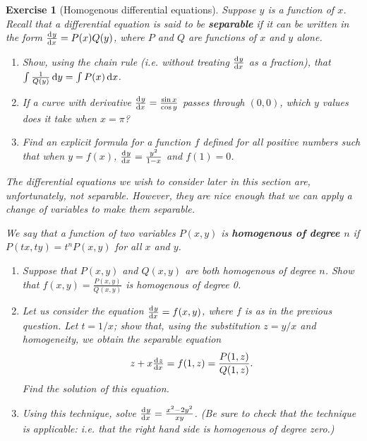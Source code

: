 \documentclass[a4paper,leqno,10pt]{article}
\theoremstyle{exercise}
\newtheorem{Exercise}{Exercise}
\newenvironment{exercise}
  {\begin{mdframed}\begin{Exercise}}
  {\end{Exercise}\end{mdframed}}
\theoremstyle{plain}
\theoremstyle{definition}
\theoremstyle{remark}
\newcommand{\df}{\textbf}
\begin{document}
\begin{exercise}[Homogenous differential equations]
  Suppose $ y $ is a function of $ x $. Recall that a differential equation is said to be \df{separable} if it can
  be written in the form $ \od{y}{x} = P(x) Q(y) $, where $ P $ and $ Q $ are functions of $ x $ and $ y $ alone.
  \begin{enumerate}
    \item Show, using the chain rule (i.e. without treating $ \od{y}{x} $ as a fraction), that $ \int \frac{1}{Q(y)} \dif{y} = \int P(x) \dif{x} $.
    \item If a curve with derivative $ \od{y}{x} = \frac{\sin x}{\cos y} $ passes through $ (0,0) $, which $ y $ values does it take when $ x = \pi $?
    \item Find an explicit formula for a function $ f $ defined for all positive numbers such that when $ y = f(x) $,
          $ \od{y}{x} = \frac{y^2}{1 - x} $ and $ f(1) = 0 $.
  \end{enumerate}

  The differential equations we wish to consider later in this section are, unfortunately, \emph{not} separable. However,
  they are nice enough that we can apply a change of variables to \emph{make} them separable.

  We say that a function of two variables $ P(x,y) $ is \df{homogenous of degree $ n $} if $ P(tx, ty) = t^nP(x,y) $ for all $ x $ and $ y $.
  \begin{enumerate}[resume]
    \item Suppose that $ P(x,y) $ and $ Q(x,y) $ are both homogenous of degree $ n $. Show that $ f(x,y) = \frac{P(x,y)}{Q(x,y)} $ is
          homogenous of degree 0.
    \item Let us consider the equation $ \od{y}{x} = f(x,y) $, where $ f $ is as in the previous question. Let $ t = 1/x $;
          show that, using the substitution $ z = y/x $ and homogeneity, we obtain the separable equation
          \begin{displaymath}
            z + x\od{z}{x} = f(1,z) = \frac{P(1,z)}{Q(1,z)}.
          \end{displaymath}
          Find the solution of this equation.
    \item Using this technique, solve $ \od{y}{x} = \frac{x^2 - 2y^2}{xy} $. (Be sure to check that the technique is applicable: i.e. that
          the right hand side is homogenous of degree zero.)
  \end{enumerate}
\end{exercise}
\end{document}
